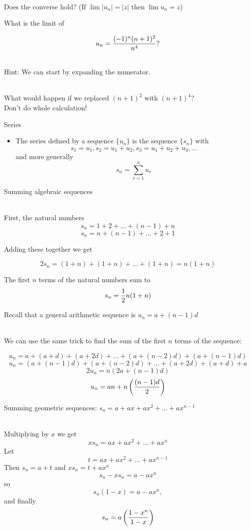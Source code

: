 \documentclass[10pt]{seminar}
\begin{document}
\begin{slide}
\ \\Does the converse hold? (If $\lim |u_n |=|z|$  then $\lim u_n=z$) %


\newslide

What is the limit of 

$$u_n={{(-1)^n(n+1)^2}\over{n^4}}?$$ %

\ \\Hint: We can start by expanding the numerator.

\ \\What would happen if we replaced $(n+1)^2$ with $(n+1)^4$?  \\Don't do whole calculation!

\newslide

Series

\begin{itemize}
\item The series defined by a sequence $\{u_n\}$ is the sequence $\{s_n\}$ with $$s_1=u_1, s_2=u_1+u_2, s_3=u_1+u_2+u_3, ...$$ and more generally $$s_n=\sum_{r=1}^{n}u_r$$
\end{itemize}

\newslide
Summing algebraic sequences

\ \\First, the natural numbers $$s_n=1+ 2+ ...+(n-1)+  n$$
 $$s_n=n + (n-1) + ...+ 2+ 1$$
 
 Adding these together we get 
 
 $$2s_n=(1+n)+(1+n)+...+(1+n)= n(1+n)$$
 
 The first $n$ terms of the natural numbers sum to 
 $$s_n={1\over 2}n(1+n)$$

\newslide

Recall that a general arithmetic sequence is $u_n=a+(n-1)d$

\ \\We can use the same trick to find the sum of the first $n$ terms of the sequence:

$$u_n=a+(a+d)+(a+2d)+...+(a+(n-2)d)+(a+(n-1)d)$$
$$u_n=(a+(n-1)d)+(a+(n-2)d)+...+(a+2d)+(a+d)+a$$
$$2u_n=n\left(2a+(n-1)d\right)$$
$$u_n=an+n\left({{(n-1)d}\over{2}}\right)$$

\newslide
Summing geometric sequences: $s_n=a+ax+ax^2+...+ax^{n-1}$

\ \\Multiplying by $x$ we get 
$$xs_n=ax+ax^2+...+ax^n$$
Let $$t=ax+ax^2+...+ax^{n-1}$$ Then $s_n=a+t$ and $xs_n=t+ax^n$   $$s_n-xs_n=a-ax^n$$ so 
$$s_n(1-x)=a-ax^n,$$ and finally $$s_n=a\left({{1-x^n}\over{1-x}}\right)$$


\end{slide}
\end{document}
